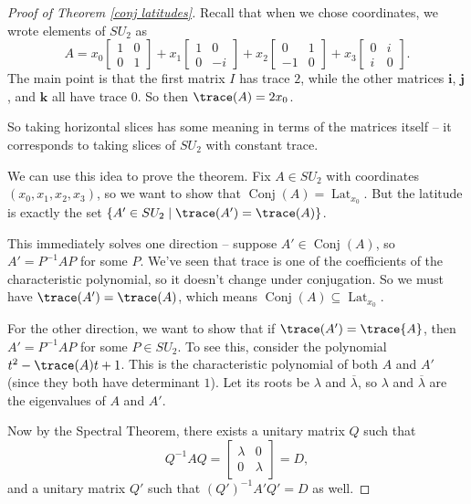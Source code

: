 \begin{proof}[Proof of Theorem \ref{conj latitudes}]
Recall that when we chose coordinates, we wrote elements of $SU_2$ as \[A = x_0\begin{bmatrix} 1 & 0 \\ 0 & 1 \end{bmatrix} + x_1\begin{bmatrix} 1 & 0 \\ 0 & -i \end{bmatrix} + x_2 \begin{bmatrix} 0 & 1 \\ -1 & 0 \end{bmatrix} + x_3\begin{bmatrix} 0 & i \\ i & 0 \end{bmatrix}.\] The main point is that the first matrix $I$ has trace $2$, while the other matrices $\mathbf{i}$, $\mathbf{j}$, and $\mathbf{k}$ all have trace $0$. So then $\trace(A) = 2x_0$. 

So taking horizontal slices has some meaning in terms of the matrices itself -- it corresponds to taking slices of $SU_2$ with constant trace. 

We can use this idea to prove the theorem. Fix $A \in SU_2$ with coordinates $(x_0, x_1, x_2, x_3)$, so we want to show that $\operatorname{Conj}(A) = \operatorname{Lat}_{x_0}$. But the latitude is exactly the set $\{A' \in SU_2 \mid \trace(A') = \trace(A)\}$. 

This immediately solves one direction -- suppose $A' \in \operatorname{Conj}(A)$, so $A' = P^{-1}AP$ for some $P$. We've seen that trace is one of the coefficients of the characteristic polynomial, so it doesn't change under conjugation. So we must have $\trace(A') = \trace(A)$, which means $\operatorname{Conj}(A) \subseteq \operatorname{Lat}_{x_0}$. 

For the other direction, we want to show that if $\trace(A') = \trace{A}$, then $A' = P^{-1}AP$ for some $P \in SU_2$. To see this, consider the polynomial $t^2 - \trace(A) t + 1$. This is the characteristic polynomial of both $A$ and $A'$ (since they both have determinant $1$). Let its roots be $\lambda$ and $\overline{\lambda}$, so $\lambda$ and $\overline{\lambda}$ are the eigenvalues of $A$ and $A'$. 

Now by the Spectral Theorem, there exists a unitary matrix $Q$ such that \[Q^{-1}AQ = \begin{bmatrix} \lambda & 0 \\ 0 & \lambda \end{bmatrix} = D,\] and a unitary matrix $Q'$ such that $(Q')^{-1}A'Q' = D$ as well. 


\end{proof}
